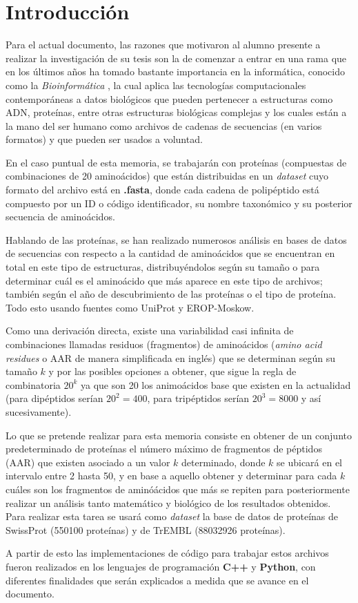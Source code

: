 \chapter*{Introducci\'on}

Para el actual documento, las razones que motivaron al alumno presente a realizar la investigación de su tesis son la de comenzar a 
entrar en una rama que en los últimos años ha tomado bastante importancia en la informática, conocido como la {\textit{Bioinformática}} \cite{bioinformatica}, la cual aplica las tecnologías computacionales contemporáneas a datos biológicos que pueden pertenecer a estructuras como ADN, proteínas, entre otras estructuras biológicas complejas y los cuales están a la mano del ser humano como archivos de cadenas de secuencias (en varios formatos) y que pueden ser usados a voluntad.

En el caso puntual de esta memoria, se trabajarán con proteínas (compuestas de combinaciones de 20 aminoácidos) que están distribuidas en un {\textit{dataset}} cuyo formato del archivo está en \textbf{.fasta}, donde cada cadena de polipéptido está compuesto por un ID o código identificador, su nombre taxonómico y su posterior secuencia de aminoácidos. 



Hablando de las proteínas, se han realizado numerosos análisis \cite{searching, array} en bases de datos de secuencias con respecto a la cantidad de aminoácidos que se encuentran en total en este tipo de estructuras, distribuyéndolos según su tamaño o para determinar cuál es el aminoácido que más aparece en este tipo de archivos; también según el año de descubrimiento de las proteínas o el tipo de proteína. Todo esto usando fuentes como UniProt y EROP-Moskow. 

Como una derivación directa, existe una variabilidad casi infinita de combinaciones llamadas residuos (fragmentos) de aminoácidos ({\textit{amino acid residues}} o AAR de manera simplificada en inglés) que se determinan según su tamaño $k$ y por las posibles opciones a obtener, que sigue la regla de combinatoria $20^{k}$ ya que son 20 los animoácidos base que existen en la actualidad (para dipéptidos serían $20^{2} = 400$, para tripéptidos serían $20^{3} = 8000$ y así sucesivamente).

Lo que se pretende realizar para esta memoria consiste en obtener de un conjunto predeterminado de proteínas el número máximo de fragmentos de péptidos (AAR) que existen asociado a un valor $k$ determinado, donde $k$ se ubicará en el intervalo entre 2 hasta 50, y en base a aquello obtener y determinar para cada $k$ cuáles son los fragmentos de aminóácidos que más se repiten para posteriormente realizar un análisis tanto matemático y biológico de los resultados obtenidos. Para realizar esta tarea se usará como \textit{dataset} la base de datos de proteínas de SwissProt (550100 proteínas) y de TrEMBL (88032926 proteínas).

A partir de esto las implementaciones de código para trabajar estos archivos fueron realizados en los lenguajes de programación {\textbf{C++}} y {\textbf{Python}}, con diferentes finalidades que serán explicados a medida que se avance en el documento.